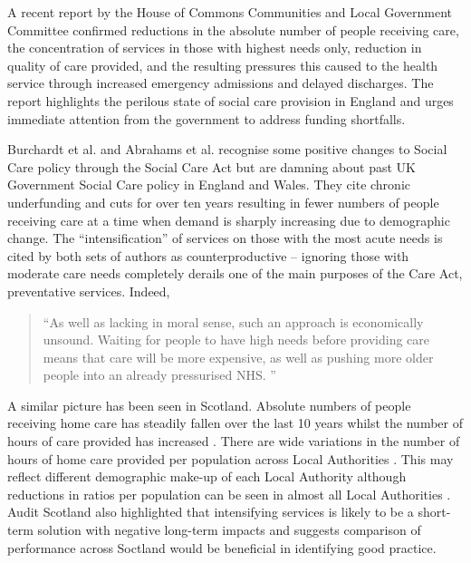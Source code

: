\documentclass[12pt,]{report}
\begin{document}
A recent report by the House of Commons Communities and Local Government
Committee \citeyearpar{RN287} confirmed reductions in the absolute
number of people receiving care, the concentration of services in those
with highest needs only, reduction in quality of care provided, and the
resulting pressures this caused to the health service through increased
emergency admissions and delayed discharges. The report highlights the
perilous state of social care provision in England and urges immediate
attention from the government to address funding shortfalls.

Burchardt et al. \citeyearpar{RN173} and Abrahams et al.
\citeyearpar{RN177} recognise some positive changes to Social Care
policy through the Social Care Act but are damning about past UK
Government Social Care policy in England and Wales. They cite chronic
underfunding and cuts for over ten years resulting in fewer numbers of
people receiving care at a time when demand is sharply increasing due to
demographic change. The ``intensification'' of services on those with
the most acute needs is cited by both sets of authors as
counterproductive -- ignoring those with moderate care needs completely
derails one of the main purposes of the Care Act, preventative services.
Indeed,

\begin{quotation}
    “As well as lacking in moral sense, such an approach is economically unsound. Waiting for people to have high needs before providing care means that care will be more expensive, as well as pushing more older people into an already pressurised NHS. ” \end{quotation}

\citep[pp.5]{RN177}

A similar picture has been seen in Scotland. Absolute numbers of people
receiving home care has steadily fallen over the last 10 years whilst
the number of hours of care provided has increased \citep{RN128}. There
are wide variations in the number of hours of home care provided per
population across Local Authorities \citep{RN449, RN128}. This may
reflect different demographic make-up of each Local Authority although
reductions in ratios per population can be seen in almost all Local
Authorities \citep{RN128}. Audit Scotland \citeyearpar{RN449} also
highlighted that intensifying services is likely to be a short-term
solution with negative long-term impacts and suggests comparison of
performance across Soctland would be beneficial in identifying good
practice.
\end{document}
